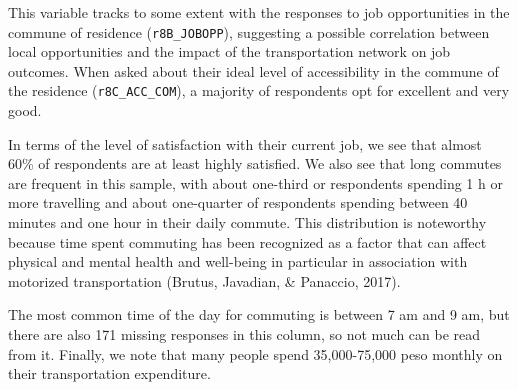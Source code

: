 \documentclass[
11pt, %
oneside, %
english, %
singlespacing, %
]{macthesis} %
\newcommand{\blandscape}{\begin{landscape}}
\newcommand{\elandscape}{\end{landscape}}
\begin{document}
This variable tracks to some extent with the responses to job opportunities in the commune of residence (\texttt{r8B\_JOBOPP}), suggesting a possible correlation between local opportunities and the impact of the transportation network on job outcomes. When asked about their ideal level of accessibility in the commune of the residence (\texttt{r8C\_ACC\_COM}), a majority of respondents opt for excellent and very good.

In terms of the level of satisfaction with their current job, we see that almost 60\% of respondents are at least highly satisfied. We also see that long commutes are frequent in this sample, with about one-third or respondents spending 1 h or more travelling and about one-quarter of respondents spending between 40 minutes and one hour in their daily commute. This distribution is noteworthy because time spent commuting has been recognized as a factor that can affect physical and mental health and well-being in particular in association with motorized transportation (Brutus, Javadian, \& Panaccio, 2017).

The most common time of the day for commuting is between 7 am and 9 am, but there are also 171 missing responses in this column, so not much can be read from it. Finally, we note that many people spend 35,000-75,000 peso monthly on their transportation expenditure.

\newpage
\blandscape
\begin{table}

\caption{\label{tab:unnamed-chunk-11}\label{tab:Travel-work-Descriptive}Variables regarding the commuting behavior of respondents}
\centering
{}
\end{table}
\elandscape
\newpage
\end{document}
